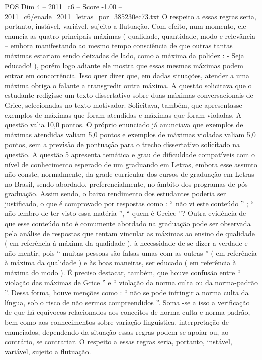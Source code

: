 \begin{textsample}{POS Dim 4 – 2011\_c6 – Score -1.00 – 2011\_c6/enade\_2011\_letras\_por\_385230ec73.txt}
O respeito a essas regras seria, portanto, instável, variável, sujeito a flutuação.
Com efeito, num momento, ele enuncia as quatro principais máximas ( qualidade, quantidade, modo e relevância – embora manifestando ao mesmo tempo consciência de que outras tantas máximas estariam sendo deixadas de lado, como a máxima da polidez : - Seja educado! ), porém logo adiante ele mostra que essas mesmas máximas podem entrar em concorrência.
Isso quer dizer que, em dadas situações, atender a uma máxima obriga o falante a transgredir outra máxima.
A questão solicitava que o estudante redigisse um texto dissertativo sobre duas máximas conversacionais de Grice, selecionadas no texto motivador.
Solicitava, também, que apresentasse exemplos de máximas que foram atendidas e máximas que foram violadas.
A questão valia 10,0 pontos.
O próprio enunciado já anunciava que exemplos de máximas atendidas valiam 5,0 pontos e exemplos de máximas violadas valiam 5,0 pontos, sem a previsão de pontuação para o trecho dissertativo solicitado na questão.
A questão 5 apresenta temática e grau de dificuldade compatíveis com o nível de conhecimento esperado de um graduando em Letras, embora esse assunto não conste, normalmente, da grade curricular dos cursos de graduação em Letras no Brasil, sendo abordado, preferencialmente, no âmbito dos programas de pós-graduação.
Assim sendo, o baixo rendimento dos estudantes poderia ser justificado, o que é comprovado por respostas como : “ não vi este conteúdo ” ; “ não lembro de ter visto essa matéria ”, “ quem é Greice ”?
Outra evidência de que esse conteúdo não é comumente abordado na graduação pode ser observada pela análise de respostas que tentam vincular as máximas ao ensino de qualidade ( em referência à máxima da qualidade ), à necessidade de se dizer a verdade e não mentir, pois “ muitas pessoas são falsas umas com as outras ” ( em referência à máxima da qualidade ) e às boas maneiras, ser educado ( em referência à máxima do modo ).
É preciso destacar, também, que houve confusão entre “ violação das máximas de Grice ” e “ violação da norma culta ou da norma-padrão ”.
Dessa forma, houve menções como : “ não se pode infringir a norma culta da língua, sob o risco de não sermos compreendidos ”.
Soma -se a isso a verificação de que há equívocos relacionados aos conceitos de norma culta e norma-padrão, bem como aos conhecimentos sobre variação linguística. interpretação de enunciados, dependendo da situação essas regras podem se apoiar ou, ao contrário, se contrariar.
O respeito a essas regras seria, portanto, instável, variável, sujeito a flutuação.

\end{textsample}
